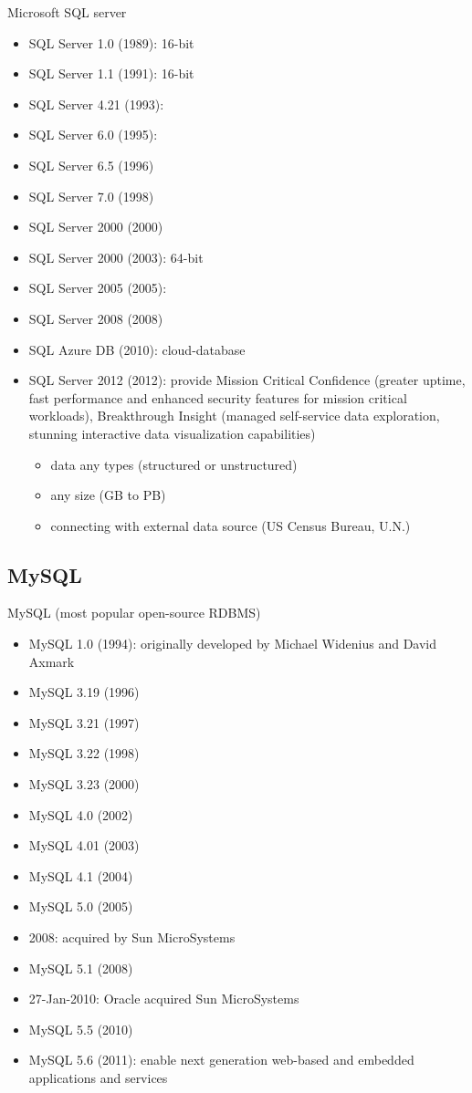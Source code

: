 Microsoft SQL server
\begin{itemize}
  \item SQL Server 1.0 (1989): 16-bit
  \item SQL Server 1.1 (1991): 16-bit
  \item SQL Server 4.21 (1993): 
  \item SQL Server  6.0 (1995): 
  \item SQL Server 6.5 (1996)
  \item SQL Server 7.0 (1998)
  \item SQL Server 2000 (2000)
  \item SQL Server 2000 (2003): 64-bit
  \item SQL Server 2005 (2005): 
  \item SQL Server 2008 (2008)
  \item SQL Azure DB (2010): cloud-database
  \item SQL Server 2012 (2012): provide Mission Critical Confidence (greater
  uptime, fast performance and enhanced security features for mission critical
  workloads), Breakthrough Insight (managed self-service data exploration,
  stunning interactive data visualization capabilities)	
  \begin{itemize}
    \item data any types (structured or unstructured)
    \item any size (GB to PB)
    \item connecting with external data source (US Census Bureau, U.N.)
  \end{itemize}
\end{itemize}

\subsection{MySQL}

MySQL (most popular open-source RDBMS)
\begin{itemize}
  \item MySQL 1.0 (1994): originally developed by Michael Widenius and David
  Axmark
  \item MySQL 3.19 (1996)
  \item MySQL 3.21 (1997)
  \item MySQL 3.22 (1998)
  \item MySQL 3.23 (2000)
  \item MySQL 4.0 (2002)
  \item MySQL 4.01 (2003)
  \item MySQL 4.1 (2004)
  \item MySQL 5.0 (2005)
  \item 2008: acquired by Sun MicroSystems
  \item MySQL 5.1 (2008)
  \item 27-Jan-2010: Oracle acquired Sun MicroSystems
  \item MySQL 5.5 (2010)
  \item MySQL 5.6 (2011): enable next generation web-based and embedded
  applications and services
\end{itemize}

